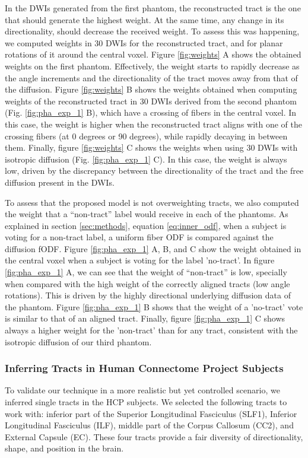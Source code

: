 In the DWIs generated from the first phantom, the reconstructed tract is the one
that should generate the highest weight. At the same time, any change in its
directionality, should decrease the received weight. To assess this was happening,
we computed weights in 30 DWIs for the reconstructed tract, and for planar
rotations of it around the central voxel. Figure \ref{fig:weights} A shows the
obtained weights on the first phantom. Effectively, the weight starts to rapidly
decrease as the angle increments and the directionality of the tract moves away
from that of the diffusion. Figure \ref{fig:weights} B shows the weights obtained
when computing weights of the reconstructed tract in 30 DWIs derived from the
second phantom (Fig. \ref{fig:pha_exp_1} B), which have a crossing of fibers in
the central voxel. In this case, the weight is higher when the reconstructed tract
aligns with one of the crossing fibers (at 0 degrees or 90 degrees), while rapidly
decaying in between them. Finally, figure \ref{fig:weights} C shows the weights
when using 30 DWIs with isotropic diffusion (Fig. \ref{fig:pha_exp_1} C). In this
case, the weight is always low, driven by the discrepancy between the
directionality of the tract and the free diffusion present in the DWIs.

To assess that the proposed model is not overweighting tracts, we also computed
the weight that a ``non-tract'' label would receive in each of the phantoms. As
explained in section \ref{sec:methods}, equation \ref{eq:inner_odf}, when a
subject is voting for a non-tract label, a uniform fiber ODF is compared against
the diffusion fODF. Figure \ref{fig:pha_exp_1} A, B, and C show the weight
obtained in the central voxel when a subject is voting for the label 'no-tract'.
In figure \ref{fig:pha_exp_1} A, we can see that the
weight of ``non-tract'' is low, specially when compared with the high weight
of the correctly aligned tracts (low angle rotations). This is driven by the
highly directional underlying diffusion data of the phantom. 
Figure \ref{fig:pha_exp_1} B shows that the weight of a 'no-tract' vote is
similar to that of an aligned tract. Finally, figure \ref{fig:pha_exp_1} C
shows always a higher weight for the 'non-tract' than for any tract, consistent
with the isotropic diffusion of our third phantom.

\subsubsection{Inferring Tracts in Human Connectome Project Subjects}
To validate our technique in a more realistic but yet controlled scenario, we
inferred single tracts in the HCP subjects. We selected the following tracts to
work with: inferior part of the Superior Longitudinal Fasciculus (SLF1),
Inferior Longitudinal Fasciculus (ILF), middle part of the
Corpus Callosum (CC2), and External Capsule (EC). These four tracts provide
a fair diversity of directionality, shape, and position in the brain.

